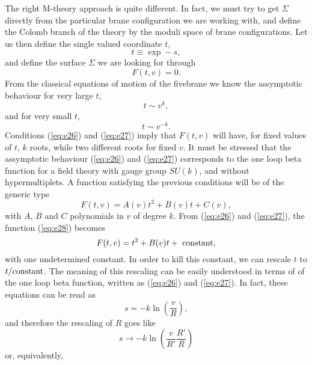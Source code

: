 The right M-theory approach is quite different. In fact, we must
try to get $\Sigma$ directly from the particular brane
configuration we are working with, and define the Colomb branch
of the theory by the moduli space of brane configurations. Let us
then define the single valued coordinate $t$,
\begin{equation}
t \equiv \exp - s,
\label{eq:e24}
\end{equation}
and define the surface $\Sigma$ we are looking for through
\begin{equation}
F(t,v)=0.
\label{eq:e25}
\end{equation}
From the classical equations of motion of the fivebrane we know
the assymptotic behaviour for very large $t$,
\begin{equation}
t \sim v^k,
\label{eq:e26}
\end{equation}
and for very small $t$,
\begin{equation}
t \sim v^{-k}.
\label{eq:e27}
\end{equation}
Conditions (\ref{eq:e26}) and (\ref{eq:e27}) imply that $F(t,v)$
will have, for fixed values of $t$, $k$ roots, while two
different roots for fixed $v$. It must be stressed that the
assymptotic behaviour (\ref{eq:e26}) and (\ref{eq:e27})
corresponds to the one loop beta function for a field theory with
gauge group $SU(k)$, and without hypermultiplets. A function
satisfying the previous conditions will be of the generic type 
\begin{equation}
F(t,v)=A(v)t^2+B(v)t+C(v),
\label{eq:e28}
\end{equation}
with $A$, $B$ and $C$ polynomials in $v$ of degree $k$. From
(\ref{eq:e26}) and (\ref{eq:e27}), the function (\ref{eq:e28}) 
becomes 
\begin{equation}
F(t,v)=t^2+B(v)t+\hbox { constant},
\label{cons}
\end{equation}
with one undetermined constant. In order to kill this constant,
we can rescale $t$ to $t/\hbox{constant}$. The meaning of this
rescaling can be easily understood in terms of of the one loop
beta function, written as (\ref{eq:e26}) and (\ref{eq:e27}). In
fact, these equations can be read as
\begin{equation}
s = - k \ln \left( \frac {v}{R} \right),
\end{equation}
and therefore the rescaling of $R$ goes like
\begin{equation}
s \rightarrow - k \ln \left( \frac {v}{R'} \frac {R'}{R} \right)
\end{equation}
or, equivalently,
